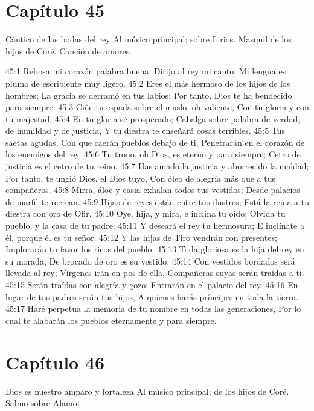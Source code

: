 \section*{Capítulo 45}
Cántico de las bodas del rey 
Al músico principal; sobre Lirios. Masquil de los hijos de Coré. Canción de amores. 
 
45:1 Rebosa mi corazón palabra buena; 
Dirijo al rey mi canto; 
Mi lengua es pluma de escribiente muy ligero. 
45:2 Eres el más hermoso de los hijos de los hombres; 
La gracia se derramó en tus labios; 
Por tanto, Dios te ha bendecido para siempre. 
45:3 Ciñe tu espada sobre el muslo, oh valiente, 
Con tu gloria y con tu majestad. 
45:4 En tu gloria sé prosperado; 
Cabalga sobre palabra de verdad, de humildad y de justicia, 
Y tu diestra te enseñará cosas terribles. 
45:5 Tus saetas agudas, 
Con que caerán pueblos debajo de ti, 
Penetrarán en el corazón de los enemigos del rey. 
45:6 Tu trono, oh Dios, es eterno y para siempre; 
Cetro de justicia es el cetro de tu reino. 
45:7 Has amado la justicia y aborrecido la maldad; 
Por tanto, te ungió Dios, el Dios tuyo, 
Con óleo de alegría más que a tus compañeros. 
45:8 Mirra, áloe y casia exhalan todos tus vestidos; 
Desde palacios de marfil te recrean. 
45:9 Hijas de reyes están entre tus ilustres; 
Está la reina a tu diestra con oro de Ofir. 
45:10 Oye, hija, y mira, e inclina tu oído; 
Olvida tu pueblo, y la casa de tu padre; 
45:11 Y deseará el rey tu hermosura; 
E inclínate a él, porque él es tu señor. 
45:12 Y las hijas de Tiro vendrán con presentes; 
Implorarán tu favor los ricos del pueblo. 
45:13 Toda gloriosa es la hija del rey en su morada; 
De brocado de oro es su vestido. 
45:14 Con vestidos bordados será llevada al rey; 
Vírgenes irán en pos de ella, 
Compañeras suyas serán traídas a ti. 
45:15 Serán traídas con alegría y gozo; 
Entrarán en el palacio del rey. 
45:16 En lugar de tus padres serán tus hijos, 
A quienes harás príncipes en toda la tierra. 
45:17 Haré perpetua la memoria de tu nombre en todas las generaciones, 
Por lo cual te alabarán los pueblos eternamente y para siempre. 
\section*{Capítulo 46}
Dios es nuestro amparo y fortaleza 
Al músico principal; de los hijos de Coré. Salmo sobre Alamot. 
 

